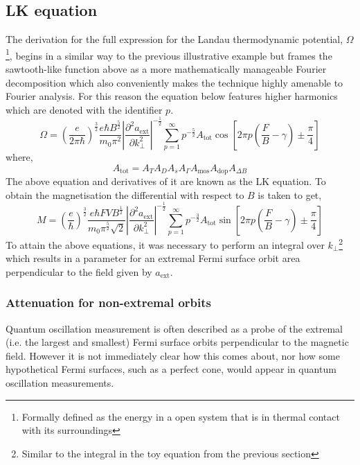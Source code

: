 \subsection{\acl{LK} equation}

The derivation for the full expression for the Landau thermodynamic potential, $\Omega$\footnote{Formally defined as the energy in a open system that is in thermal contact with its surroundings}, begins in a similar way to the previous illustrative example but frames the sawtooth-like function above as a more mathematically manageable Fourier decomposition which also conveniently makes the technique highly amenable to Fourier analysis. For this reason the equation below features higher harmonics which are denoted with the identifier $p$.
\begin{equation}
\Omega = \left(\frac{e}{2\pi\hbar}\right)^{\frac{3}{2}}\frac{e\hbar B^{\frac{5}{2}}}{m_0 \pi^2}\left| \frac{\partial^2 a_{\textrm{ext}}}{\partial k^2_\perp}\right|^{-\frac{1}{2}}\sum_{p=1}^{\infty}p^{-\frac{5}{2}}A_{\textrm{tot}}\cos\left[2\pi p\left(\frac{F}{B} - \gamma\right)\pm\frac{\pi}{4}\right]
\end{equation}
where,
\begin{equation}
A_{\textrm{tot}} = A_T A_D A_s A_{\Gamma} A_{\textrm{mos}} A_{\textrm{dop}} A_{\Delta B}
\end{equation}
The above equation and derivatives of it are known as the \ac{LK} equation. To obtain the magnetisation the differential with respect to $B$ is taken to get,
\begin{equation}
M = \left(\frac{e}{\hbar}\right)^{\frac{3}{2}}\frac{e\hbar F V B^{\frac{1}{2}}}{m_0 \pi^\frac{5}{2}\sqrt{2}}\left| \frac{\partial^2 a_{\textrm{ext}}}{\partial k^2_\perp}\right|^{-\frac{1}{2}}\sum_{p=1}^{\infty}p^{-\frac{3}{2}}A_{\textrm{tot}}\sin\left[2\pi p\left(\frac{F}{B} - \gamma\right)\pm\frac{\pi}{4}\right]
\end{equation}
To attain the above equations, it was necessary to perform an integral over $k_\perp$\footnote{Similar to the integral in the toy equation from the previous section} which results in a parameter for an extremal Fermi surface orbit area perpendicular to the field given by $a_{\textrm{ext}}$. 

\subsubsection{Attenuation for non-extremal orbits}

Quantum oscillation measurement is often described as a probe of the extremal (i.e. the largest and smallest) Fermi surface orbits perpendicular to the magnetic field. However it is not immediately clear how this comes about, nor how some hypothetical Fermi surfaces, such as a perfect cone, would appear in quantum oscillation measurements.

